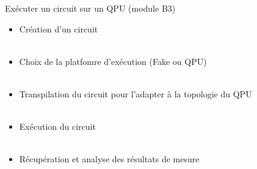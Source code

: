 \documentclass[aspectratio=169,12pt]{beamer}
\begin{document}
\begin{frame}{Exécuter un circuit sur un QPU (module B3)}
  \begin{itemize}
    \item Création d'un circuit\\~\\
    \item Choix de la platfomre d'exécution (Fake ou QPU)\\~\\
    \item Transpilation du circuit pour l'adapter à la topologie du QPU\\~\\
    \item Exécution du circuit \\~\\
    \item Récupération et analyse des résultats de mesure
  \end{itemize}
\end{frame}




\end{document}
